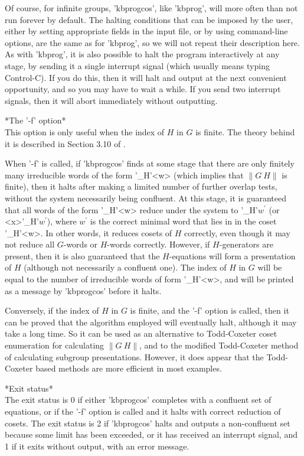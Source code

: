Of course, for infinite groups, 'kbprogcos', like 'kbprog',
will more often than not run forever by default.
The halting conditions that can be imposed by the user, either by
setting appropriate fields in the input file, or by using
command-line options, are the same as for 'kbprog', so we will not
repeat their description here.  As with 'kbprog',
it is also possible to halt the program interactively at any stage, by
sending it a single interrupt signal (which usually means typing Control-C).
If you do this, then it will halt and output at the next convenient
opportunity, and so you may have to wait a while. If you send two interrupt
signals, then it will abort immediately without outputting.

*The '-f' option*\\
This option is only useful when the index of $H$ in $G$ is finite.
The theory behind it is described in Section 3.10 of \cite{Sims94}.

When '-f' is called, if 'kbprogcos' finds at some stage that there are only
finitely many irreducible words of the form '\_H'<w> (which implies
that $\|G\:H\|$ is finite), then it halts after making a limited number of
further overlap tests, without the system necessarily being confluent.
At this stage, it is guaranteed that all words of the form '\_H'<w>
reduce under the system to '\_H'$w^\prime$ (or <x>'\_H'$w^\prime$), where
$w^\prime$ is the correct minimal word that lies in in the coset '\_H'<w>.
In other words, it reduces cosets of $H$ correctly, even though it may not
reduce all $G$-words or $H$-words correctly. However, if $H$-generators are
present, then it is also guaranteed that the $H$-equations will form a
presentation of $H$ (although not necessarily a confluent one).
The index of $H$ in $G$ will be equal to the number of irreducible words of
form '\_H'<w>, and will be printed as a message by 'kbprogcos' before it
halts.

Conversely, if the index of $H$ in $G$ is finite, and the '-f' option is
called, then it can be proved that the algorithm employed will eventually
halt, although it may take a long time. So it can be used as an
alternative to Todd-Coxeter coset enumeration for calculating $\|G\:H\|$, and
to the modified Todd-Coxeter method of calculating subgroup presentations.
However, it does appear that the Todd-Coxeter based methods are more
efficient in most examples.

*Exit status*\\
The exit status is 0 if either 'kbprogcos' completes with a confluent set of
equations, or if the '-f' option is called and it halts with correct
reduction of cosets. The exit status is
2 if 'kbprogcos' halts and outputs a non-confluent set because some limit has
been exceeded, or it has received an interrupt signal, and 1 if it exits
without output, with an error message.

